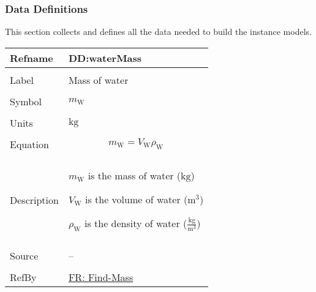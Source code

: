 \documentclass[12pt]{article}
\begin{document}
\subsubsection{Data Definitions}
\label{Sec:DDs}
This section collects and defines all the data needed to build the instance models.

\vspace{\baselineskip}
\noindent
\begin{minipage}{\textwidth}
\begin{tabular}{>{\raggedright}p{}>{\raggedright\arraybackslash}p{}}
\toprule \textbf{Refname} & \textbf{DD:waterMass}
\label{DD:waterMass}
\\ \midrule \\
Label & Mass of water
        
\\ \midrule \\
Symbol & ${m_{\text{W}}}$
         
\\ \midrule \\
Units & ${\text{kg}}$
        
\\ \midrule \\
Equation & \begin{displaymath}
           {m_{\text{W}}}={V_{\text{W}}} {ρ_{\text{W}}}
           \end{displaymath}
\\ \midrule \\
Description & \begin{symbDescription}
              \item{${m_{\text{W}}}$ is the mass of water (${\text{kg}}$)}
              \item{${V_{\text{W}}}$ is the volume of water (${\text{m}^{3}}$)}
              \item{${ρ_{\text{W}}}$ is the density of water ($\frac{\text{kg}}{\text{m}^{3}}$)}
              \end{symbDescription}
\\ \midrule \\
Source & --
         
\\ \midrule \\
RefBy & \hyperref[findMass]{FR: Find-Mass}
        
\\ \bottomrule
\end{tabular}
\end{minipage}
\end{document}

